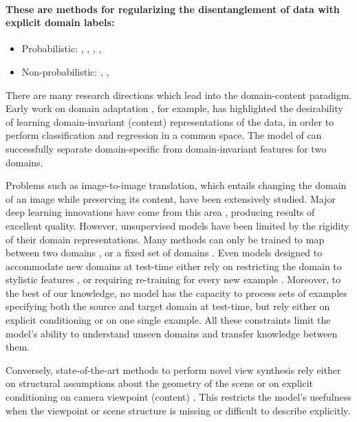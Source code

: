 \documentclass{article}
\begin{document}
\paragraph{These are methods for regularizing the disentanglement of data with explicit domain labels:}

\begin{itemize}
    \item Probabilistic: \cite{Kingma2014AutoEncodingVB}, \cite{Narayanaswamy2017LearningDR}, \cite{Louizos2016TheVF}, \cite{Ilse2020DIVADI}, \cite{Klys2018LearningLS}
    \item Non-probabilistic: \cite{Mathieu2016DisentanglingFO}, \cite{Lample2017FaderNM}, \cite{Hadad2018ATD}
\end{itemize}

There are many research directions which lead into the domain-content paradigm. Early work on domain adaptation \citep{ben2010theory,ganin2016domain}, for example, has highlighted the desirability of learning domain-invariant (content) representations of the data, in order to perform classification and regression in a common space. The model of \citet{gonzalez2018image} can successfully separate domain-specific from domain-invariant features for two domains.

Problems such as image-to-image translation, which entails changing the domain of an image while preserving its content, have been extensively studied. Major deep learning innovations have come from this area \citep{isola2017image, zhu2017unpaired}, producing results of excellent quality. However, unsupervised models have been limited by the rigidity of their domain representations. Many methods can only be trained to map between two domains \citep{zhu2017unpaired, taigman2016unsupervised}, or a fixed set of domains \citep{choi2018stargan, choi2019starganv2, lee2019drit++}. Even models designed to accommodate new domains at test-time either rely on restricting the domain to stylistic features \citep{liu2019few}, or requiring re-training for every new example \citep{benaim2018one}. Moreover, to the best of our knowledge, no model has the capacity to process sets of examples specifying both the source and target domain at test-time, but rely either on explicit conditioning or on one single example. All these constraints limit the model's ability to understand unseen domains and transfer knowledge between them.

Conversely, state-of-the-art methods to perform novel view synthesis rely either on structural assumptions about the geometry of the scene \citep{sitzmann2019scene, yoon2020novel} or on explicit conditioning on camera viewpoint (content) \citep{eslami2018neural, mildenhall2020nerf}. This restricts the model's usefulness when the viewpoint or scene structure is missing or difficult to describe explicitly.
\end{document}
